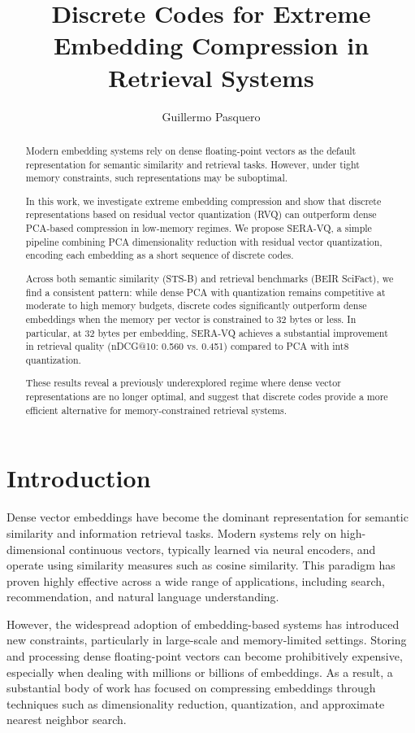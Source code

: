 \documentclass{article}
\title{Discrete Codes for Extreme Embedding Compression in Retrieval Systems}
\author{Guillermo Pasquero}
\begin{document}
\maketitle

\begin{abstract}
Modern embedding systems rely on dense floating-point vectors as the default representation for semantic similarity and retrieval tasks. However, under tight memory constraints, such representations may be suboptimal.

In this work, we investigate extreme embedding compression and show that discrete representations based on residual vector quantization (RVQ) can outperform dense PCA-based compression in low-memory regimes. We propose SERA-VQ, a simple pipeline combining PCA dimensionality reduction with residual vector quantization, encoding each embedding as a short sequence of discrete codes.

Across both semantic similarity (STS-B) and retrieval benchmarks (BEIR SciFact), we find a consistent pattern: while dense PCA with quantization remains competitive at moderate to high memory budgets, discrete codes significantly outperform dense embeddings when the memory per vector is constrained to 32 bytes or less. In particular, at 32 bytes per embedding, SERA-VQ achieves a substantial improvement in retrieval quality (nDCG@10: 0.560 vs. 0.451) compared to PCA with int8 quantization.

These results reveal a previously underexplored regime where dense vector representations are no longer optimal, and suggest that discrete codes provide a more efficient alternative for memory-constrained retrieval systems.
\end{abstract}

\section{Introduction}

Dense vector embeddings have become the dominant representation for semantic similarity and information retrieval tasks. Modern systems rely on high-dimensional continuous vectors, typically learned via neural encoders, and operate using similarity measures such as cosine similarity. This paradigm has proven highly effective across a wide range of applications, including search, recommendation, and natural language understanding.

However, the widespread adoption of embedding-based systems has introduced new constraints, particularly in large-scale and memory-limited settings. Storing and processing dense floating-point vectors can become prohibitively expensive, especially when dealing with millions or billions of embeddings. As a result, a substantial body of work has focused on compressing embeddings through techniques such as dimensionality reduction, quantization, and approximate nearest neighbor search.
\end{document}
